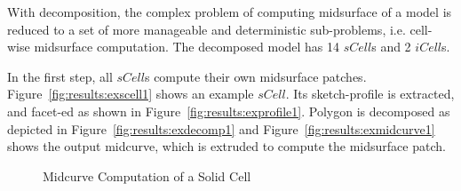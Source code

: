 With decomposition, the complex problem of computing midsurface of a model is reduced to a set of more manageable and deterministic sub-problems, i.e. cell-wise midsurface computation. The decomposed model has 14 $sCell$s and 2 $iCell$s.

In the first step, all $sCell$s compute their own midsurface patches. Figure~\ref{fig:results:exscell1} shows an example $sCell$. Its sketch-profile is extracted, and facet-ed as shown in Figure~\ref{fig:results:exprofile1}. Polygon is decomposed as depicted in Figure~\ref{fig:results:exdecomp1} and  Figure~\ref{fig:results:exmidcurve1} shows the output midcurve, which is extruded to compute the midsurface patch.




\begin{figure}[!h]
\centering     %
{}\hfill
{}\hfill
{}\hfill
{}
\caption{Midcurve Computation of a Solid Cell}\label{fig:results:midcurvescell1}
\end{figure}



